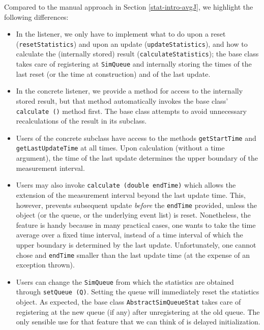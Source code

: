 \documentclass[12pt]{book}
\begin{document}
Compared to the manual approach in Section \ref{stat-intro-avgJ},
  we highlight the following differences:
\begin{itemize}
\item In the listener, we only have to implement what to do upon a reset
        (\lstinline|resetStatistics|) and upon an update (\lstinline|updateStatistics|),
        and how to calculate the (internally stored) result (\lstinline|calculateStatistics|);
        the base class takes care of registering at \lstinline-SimQueue-
        and internally storing the times of the last reset (or the time at construction)
        and of the last update.
\item In the concrete listener, we provide a method for access to the internally
        stored result, but that method automatically invokes the base class'
        \lstinline-calculate ()- method first.
      The base class attempts to avoid unnecessary recalculations of the result
        in its subclass.
\item Users of the concrete subclass have access to the methods \lstinline|getStartTime|
        and \lstinline|getLastUpdateTime| at all times.
      Upon calculation (without a time argument), the time of the last update
        determines the upper boundary of the measurement interval.
\item Users may also invoke \lstinline|calculate (double endTime)| which allows the extension
        of the measurement interval beyond the last update time.
      This, however, prevents subsequent update {\em before\/} the \lstinline|endTime| provided,
        unless the object (or the queue, or the underlying event list) is reset.
      Nonetheless, the feature is handy because in many practical cases,
        one wants to take the time average over a fixed time interval,
        instead of a time interval of which the upper boundary is determined by the last update.
      Unfortunately, one cannot chose and \lstinline|endTime| smaller than the last
        update time (at the expense of an exception thrown).
\item Users can change the \lstinline|SimQueue| from which the statistics are obtained
        through \lstinline|setQueue (Q)|.
      Setting the queue will immediately reset the statistics object.
      As expected, the base class \lstinline|AbstractSimQueueStat| takes care of
        registering at the new queue (if any) after unregistering at the old queue.
      The only sensible use for that feature that we can think of is delayed initialization.
\end{itemize}
\end{document}
